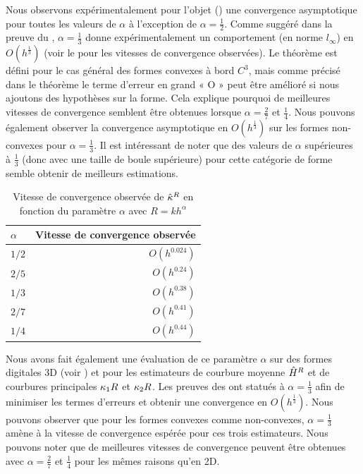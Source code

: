 Nous observons expérimentalement pour l'objet \Ellipse
() une convergence asymptotique pour
toutes les valeurs de $\alpha$ à l'exception de $\alpha = \frac{1}{2}$. Comme
suggéré dans la preuve du , $\alpha =
\frac{1}{3}$ donne expérimentalement un comportement (en norme $l_\infty$) en
$O(h^\frac{1}{3})$ (voir le  pour les
vitesses de convergence observées). Le théorème est défini pour le cas général
des formes convexes à bord $C^3$, mais comme précisé dans le théorème le terme
d'erreur en grand « O » peut être amélioré si nous ajoutons des hypothèses sur
la forme. Cela explique pourquoi de meilleures vitesses de convergence semblent
être obtenues lorsque $\alpha = \frac{2}{7}$ et $\frac{1}{4}$. Nous pouvons
également observer la convergence asymptotique en $O(h^\frac{1}{3})$ sur les
formes non-convexes pour $\alpha = \frac{1}{3}$. Il est intéressant de noter que
des valeurs de $\alpha$ supérieures à $\frac{1}{3}$ (donc avec une taille de
boule supérieure) pour cette catégorie de forme semble obtenir de meilleurs
estimations.
%
\begin{table}[ht]
\centering
\caption{Vitesse de convergence observée de $\hat{\kappa}^{R}$ en fonction du paramètre $\alpha$ avec $R=kh^\alpha$}
\label{tab:convergence-speed-alpha-2d}
\begin{tabular}{@{}lr@{}}
 $\alpha$ & Vitesse de convergence observée \\ \midrule
 $1/2$    & $O(h^{0.024})$                    \\
 $2/5$    & $O(h^{0.24})$                    \\
 $1/3$    & $O(h^{0.38})$                    \\
 $2/7$    & $O(h^{0.41})$                    \\
 $1/4$    & $O(h^{0.44})$                    \\ \bottomrule
\end{tabular}
\end{table}
%


Nous avons fait également une évaluation de ce paramètre $\alpha$ sur des formes
digitales 3D (voir ) \RoundedCube et
\Goursat pour les estimateurs de courbure moyenne $\hat{H}^{R}$ et de
courbures principales $\kappa_{1}{R}$ et $\kappa_{2}{R}$. Les preuves des
ont statués à $\alpha = \frac{1}{3}$ afin de minimiser les termes d'erreurs et
obtenir une convergence en $O(h^\frac{1}{3})$. Nous pouvons observer que pour les
formes convexes comme non-convexes, $\alpha = \frac{1}{3}$ amène à la vitesse de
convergence espérée pour ces trois estimateurs. Nous pouvons noter que de
meilleures vitesses de convergence peuvent être obtenues avec $\alpha =
\frac{2}{7}$ et $\frac{1}{4}$ pour les mêmes raisons qu'en 2D.


